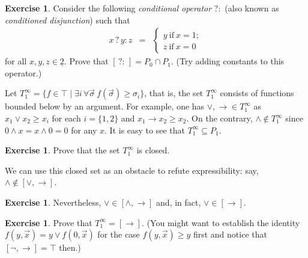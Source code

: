 \documentclass[12pt,notitlepage]{article}
\theoremstyle{plain}
\theoremstyle{definition}
\newtheorem{exc}[thm]{Exercise}
\theoremstyle{plain}
\newcommand{\sbs}{\subseteq}
\newcommand{\ul}[1]{\underline{#1}}
\newcommand{\1}{\mathbf{1}}
\newcommand{\0}{\mathbf{0}}
\begin{document}
\begin{exc} Consider the following \emph{conditional operator} ${?}{:}$ (also known as \emph{conditioned disjunction}) such that 
$$\begin{array}{rcl}
x\mathrel{?}y\mathrel{:}z &=& \begin{cases}
	    y\ \mbox{if}\ x = 1;\\
	    z\ \mbox{if}\ x = 0
          \end{cases}
\end{array}$$
for all $x,y,z \in \ul{2}$.
Prove that  $[\,{?}{:}\,] = P_0 \cap P_1$. (Try adding constants to this operator.)
\end{exc}

Let $T^\infty_1 = \{ f\in \top \mid \exists i\, \forall \vec \sigma\ f(\vec \sigma) \geq \sigma_i \}$, that is, the set $T^\infty_1$ consists of functions bounded below by an argument. For example, one has ${\vee}, {\to} \in T^\infty_1$ as $x_1 \vee x_2 \geq x_i$ for each $i = \{1, 2\}$ and $x_1 \to x_2 \geq x_2$. On the contrary, ${\wedge} \notin T^\infty_1$ since $0 \wedge x = x \wedge 0 = 0$ for any $x$. It is easy to see that $T^\infty_1 \sbs P_1$.

\begin{exc}
Prove that the set $T^\infty_1$ is closed.
\end{exc}

\noindent We can use this closed set as an obstacle to refute expressibility: say, $\wedge \notin [{\vee}, {\to}]$.
\begin{exc}
Nevertheless, $\vee \in [{\wedge}, {\to}]$ and, in fact, $\vee \in [{\to}]$.
\end{exc}
\begin{exc}
Prove that $T^\infty_1 = [\to]$. (You might want to establish the identity $f(y, \vec x) = y \vee f(0, \vec x)$ for the case $f(y,\vec x) \geq y$ first and notice that $[{\neg}, {\to}] = \top$ then.)
\end{exc}
\end{document}
